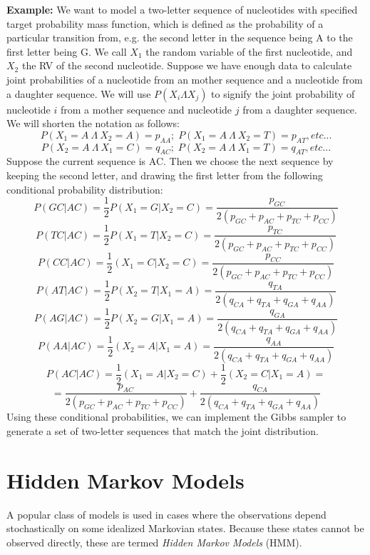 \documentclass[11pt]{book}
\begin{document}
\textbf{Example:} We want to model a two-letter sequence of nucleotides with specified target probability mass function, which is defined as the probability of a particular transition from, e.g. the second letter in the sequence being A to the first letter being G.  We call $X_1$ the random variable of the first nucleotide, and $X_2$ the RV of the second nucleotide. Suppose we have enough data to calculate joint probabilities of a nucleotide from an mother sequence and a nucleotide from a daughter sequence. We will use $P(X_i \Lambda X_j)$ to signify the joint probability of nucleotide $i$ from a mother sequence and nucleotide $j$ from a daughter sequence. We will shorten the notation as follows:
$$P( X_1 = A \  \Lambda \ X_2 = A) = p_{AA}; \; P(X_1 =  A \ \Lambda \ X_2 = T) = p_{AT}, etc... $$ 
$$P(X_2 =  A \ \Lambda \ X_1 = C) = q_{AC}; \; P(X_2 = A \ \Lambda \ X_1 = T) = q_{AT}, etc... $$ 
Suppose the current sequence is AC. Then we choose the next sequence by keeping the second letter, and drawing the first letter from the following conditional probability distribution:
$$ P(GC | AC) = \frac{1}{2} P(X_1 = G | X_2 = C) = \frac{p_{GC}}{2(p_{GC} + p_{AC} + p_{TC} + p_{CC}) } $$
$$ P(TC | AC) = \frac{1}{2} P(X_1 = T | X_2 = C)  = \frac{p_{TC}}{2(p_{GC} + p_{AC} + p_{TC} + p_{CC}) } $$
$$ P(CC | AC) = \frac{1}{2} (X_1 = C | X_2 = C) = \frac{p_{CC}}{2(p_{GC} + p_{AC} + p_{TC} + p_{CC}) } $$
$$ P(AT | AC) = \frac{1}{2} P(X_2 = T | X_1 = A) = \frac{q_{TA}}{2(q_{CA} + q_{TA} + q_{GA} + q_{AA})}$$
$$ P(AG | AC) = \frac{1}{2} P(X_2 = G | X_1 = A)  = \frac{q_{GA}}{2(q_{CA} + q_{TA} + q_{GA} + q_{AA})} $$
$$ P(AA | AC) = \frac{1}{2} (X_2 = A | X_1 = A) = \frac{q_{AA}}{2(q_{CA} + q_{TA} + q_{GA} + q_{AA})}$$
$$ P(AC | AC) = \frac{1}{2}  (X_1 = A | X_2 = C) +  \frac{1}{2}  (X_2 = C | X_1 = A)  = $$
$$ = \frac{p_{AC}}{2(p_{GC} + p_{AC} + p_{TC} + p_{CC}) } + \frac{q_{CA}}{2(q_{CA} + q_{TA} + q_{GA} + q_{AA})} $$
Using these conditional probabilities, we can implement the Gibbs sampler to generate a set of two-letter sequences that match the joint distribution.

\section{Hidden Markov Models}

A popular class of models is used in cases where the observations depend stochastically on some idealized Markovian states. Because these states cannot be observed directly, these are termed \emph{Hidden Markov Models} (HMM). 
\end{document}
